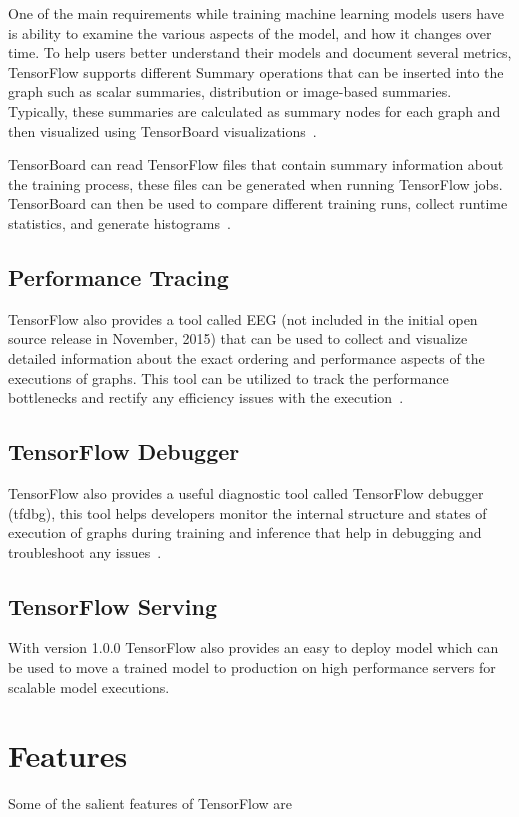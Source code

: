 One of the main requirements while training machine learning models
users have is ability to examine the various aspects of the model, and
how it changes over time. To help users better understand their models
and document several metrics, TensorFlow supports different Summary
operations that can be inserted into the graph such as scalar
summaries, distribution or image-based summaries. Typically, these
summaries are calculated as summary nodes for each graph and then
visualized using TensorBoard
visualizations~\cite{hid-sp18-510-tensorflow2015-whitepaper}.

TensorBoard can read TensorFlow files that contain summary information
about the training process, these files can be generated when running
TensorFlow jobs. TensorBoard can then be used to compare different
training runs, collect runtime statistics, and generate
histograms~\cite{hid-sp18-510-tfblog}.

\subsection{Performance Tracing}
TensorFlow also provides a tool called EEG (not included in the
initial open source release in November, 2015) that can be used to
collect and visualize detailed information about the exact ordering
and performance aspects of the executions of graphs. This tool can be
utilized to track the performance bottlenecks and rectify any
efficiency issues with the execution~\cite{hid-sp18-510-tensorflow2015-whitepaper}.

\subsection{TensorFlow Debugger}
TensorFlow also provides a useful diagnostic tool called TensorFlow
debugger (tfdbg), this tool helps developers monitor the internal
structure and states of execution of graphs during training and
inference that help in debugging and troubleshoot any issues~\cite{hid-sp18-510-tfblog}.

\subsection{TensorFlow Serving}
With version 1.0.0 TensorFlow also provides an easy to deploy model
which can be used to move a trained model to production on high
performance servers for scalable model executions\cite{hid-sp18-510-tfblog}.

\section{Features}
Some of the salient features of TensorFlow are~\cite{hid-sp18-510-tfblog}

